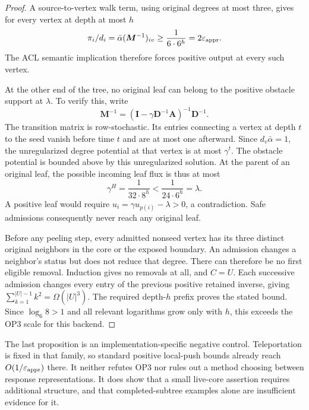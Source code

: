 \begin{proof}
A source-to-vertex walk term, using original degrees at most three, gives
for every vertex at depth at most $h$
\[
 \pi_i/d_i=\bar\alpha(\bm M^{-1})_{iv}
 \geq\frac1{6\cdot6^h}=2\varepsilon_{\mathrm{appr}}.
\]
The ACL semantic implication therefore forces positive output at every
such vertex.

At the other end of the tree, no original leaf can belong to the positive
obstacle support at $\lambda$. To verify this, write
\[
 \bm M^{-1}=(\bm I-\gamma\bm D^{-1}\bm A)^{-1}\bm D^{-1}.
\]
The transition matrix is row-stochastic. Its entries connecting a vertex
at depth $t$ to the seed vanish before time $t$ and are at most one
afterward. Since $d_v\bar\alpha=1$, the unregularized degree potential
at that vertex is at most $\gamma^t$. The obstacle potential is bounded
above by this unregularized solution. At the parent of an original leaf,
the possible incoming leaf flux is thus at most
\[
 \gamma^H=\frac1{32\cdot8^h}
 <\frac1{24\cdot6^h}=\lambda.
\]
A positive leaf would require $u_i=\gamma u_{p(i)}-\lambda>0$, a
contradiction. Safe admissions consequently never reach any original leaf.

Before any peeling step, every admitted nonseed vertex has its three
distinct original neighbors in the core or the exposed boundary. An
admission changes a neighbor's status but does not reduce that degree.
There can therefore be no first eligible removal. Induction gives no
removals at all, and $C=U$. Each successive admission changes every entry
of the previous positive retained inverse, giving
$\sum_{k=1}^{|U|-1}k^2=\Omega(|U|^3)$. The required depth-$h$ prefix
proves the stated bound. Since $\log_6 8>1$ and all relevant logarithms
grow only with $h$, this exceeds the OP3 scale for this backend.
\end{proof}

The last proposition is an implementation-specific negative control.
Teleportation is fixed in that family, so standard positive local-push
bounds already reach $O(1/\varepsilon_{\mathrm{appr}})$ there. It neither refutes OP3 nor
rules out a method choosing between response representations. It does show
that a small live-core assertion requires additional structure, and that
completed-subtree examples alone are insufficient evidence for it.
